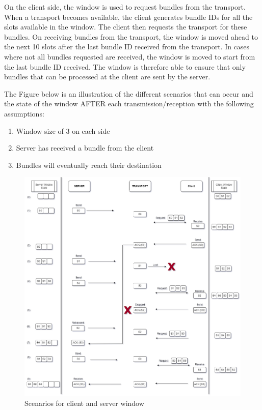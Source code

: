 On the client side, the window is used to request bundles from the transport. When a transport becomes available, the client generates bundle IDs for all the slots available in the window. The client then requests the transport for these bundles. On receiving bundles from the transport, the window is moved ahead to the next 10 slots after the last bundle ID received from the transport. In cases where not all bundles requested are received, the window is moved to start from the last bundle ID received.
The window is therefore able to ensure that only bundles that can be processed at the client are sent by the server.

The Figure below is an illustration of the different scenarios that can occur and the state of the window AFTER each transmission/reception with the following assumptions: 
\begin{enumerate}[label=(\arabic*)]
\item Window size of 3 on each side
\item Server has received a bundle from the client
\item Bundles will eventually reach their destination
\end{enumerate}

\begin{figure}[ht!]
\centering
\includegraphics[width= 160mm]{./images/Window_scenarios.drawio.png}
\caption{Scenarios for client and server window}
\end{figure}

